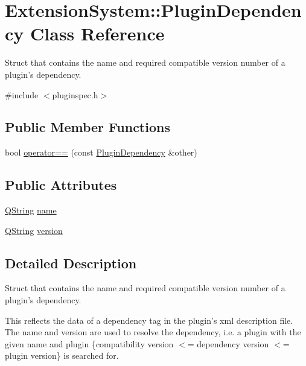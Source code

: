 \hypertarget{struct_extension_system_1_1_plugin_dependency}{\section{Extension\-System\-:\-:Plugin\-Dependency Class Reference}
\label{struct_extension_system_1_1_plugin_dependency}
}


Struct that contains the name and required compatible version number of a plugin's dependency.  




{\ttfamily \#include $<$pluginspec.\-h$>$}

\subsection*{Public Member Functions}
\begin{DoxyCompactItemize}
\item 
bool \hyperlink{struct_extension_system_1_1_plugin_dependency_a241605ff225f90b4be7cd83dc9e30828}{operator==} (const \hyperlink{struct_extension_system_1_1_plugin_dependency}{Plugin\-Dependency} \&other)
\end{DoxyCompactItemize}
\subsection*{Public Attributes}
\begin{DoxyCompactItemize}
\item 
\hyperlink{group___u_a_v_objects_plugin_gab9d252f49c333c94a72f97ce3105a32d}{Q\-String} \hyperlink{struct_extension_system_1_1_plugin_dependency_acd2cf6b00e6408b5fe155340a8159183}{name}
\item 
\hyperlink{group___u_a_v_objects_plugin_gab9d252f49c333c94a72f97ce3105a32d}{Q\-String} \hyperlink{struct_extension_system_1_1_plugin_dependency_a2d00bf5564134af5cb2eeddf2074eee8}{version}
\end{DoxyCompactItemize}


\subsection{Detailed Description}
Struct that contains the name and required compatible version number of a plugin's dependency. 

This reflects the data of a dependency tag in the plugin's xml description file. The name and version are used to resolve the dependency, i.\-e. a plugin with the given name and plugin {\ttfamily \{compatibility} version $<$= dependency version $<$= plugin version\} is searched for.

